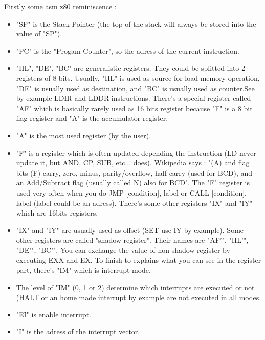 \documentclass[10pt]{report}
\begin{document}
Firstly some asm z80 reminiscence :\newline
\begin{itemize}
\item "SP" is the Stack Pointer (the top of the stack will always be stored into the value of "SP").\newline
\item "PC" is the "Progam Counter", so the adress of the current instruction.\newline
\item "HL", "DE", "BC" are generalistic registers. They could be splitted into 2 registers of 8 bits.\newline
Usually, "HL" is used as source for load memory operation, "DE" is usually used as destination, and "BC" is usually used as counter.See by example LDIR and LDDR instructions.\newline
There's a special register called "AF" which is basically rarely used as 16 bits register because "F" is a 8 bit flag register and "A" is the accumulator register.\newline
\item "A" is the most used register (by the user).\newline
\item "F" is a register which is often updated depending the instruction (LD never update it, but AND, CP, SUB, etc... does).\newline
Wikipedia says : "(A) and flag bits (F) carry, zero, minus, parity/overflow, half-carry (used for BCD), and an Add/Subtract flag (usually called N) also for BCD".\newline
The "F" register is used very often when you do JMP [condition], label or CALL [condition], label  (label could be an adress).\newline
There's some other registers "IX" and "IY" which are 16bits registers.\newline
\item "IX" and "IY" are usually used as offset (SET use IY by example).\newline
Some other registers are called "shadow register".\newline
Their names are "AF'", "HL'", "DE'", "BC'".\newline
You can exchange the value of non shadow register by executing EXX and EX.\newline
To finish to explains what you can see in the register part, there's "IM" which is interrupt mode.\newline 
\item The level of "IM" (0, 1 or 2) determine which interrupts are executed or not (HALT or an home made interrupt by example are not executed in all modes.\newline
\item "EI" is enable interrupt.\newline
\item "I" is the adress of the interrupt vector.\newline
\end{itemize}
\end{document}
